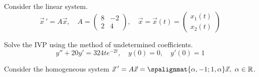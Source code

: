 \documentclass[12pt]{exam}
\begin{document}
\begin{questions}
    



    \newpage \Initials
    \question[8] Consider the linear system. $$\vec x \, ' = A \vec x, \quad A = \begin{pmatrix} 8&-2\\2&4 \end{pmatrix}, \quad \vec x = \vec x(t) = \begin{pmatrix} x_1(t) \\ x_2(t) \end{pmatrix}$$



    \newpage \Initials
    \question[10] Solve the IVP using the method of undetermined coefficients.
    $$y''+20y'=324te^{-2t}, \quad y(0)=0, \quad y'(0) = 1$$
    
    








    \newpage \Initials

    \question[3] %
    Consider the homogeneous system $\displaystyle \vec x \, ' = A \vec x = \spalignmat{\alpha, -1;1, \alpha}\vec x, \ \alpha \in \mathbb R$. 
\end{questions}
\end{document}
